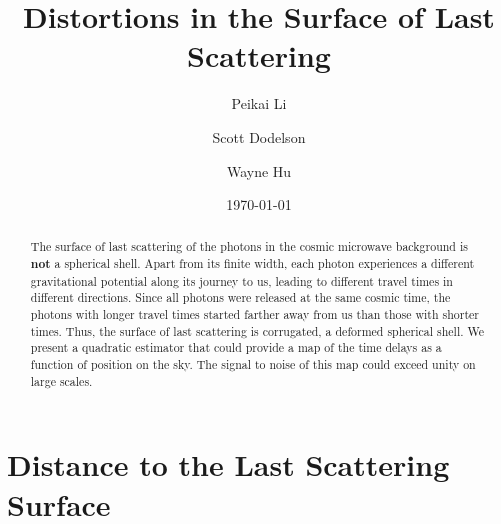 \documentclass[prl,amsmath,amssymb,floatfix,superscriptaddress,nofootinbib,twocolumn]{revtex4-1}
\begin{document}
\title{Distortions in the Surface of Last Scattering}


\author{\large Peikai Li}
\author{\large Scott Dodelson}
\author{\large Wayne Hu}

\date{\today}

\begin{abstract}
The surface of last scattering of the photons in the cosmic microwave background is {\bf not} a spherical shell. Apart from its finite width, each photon experiences a different gravitational potential along its journey to us, leading to different travel times in different directions. Since all photons were released at the same cosmic time, the photons with longer travel times started farther away from us than those with shorter times. Thus, the surface of last scattering is corrugated, a deformed spherical shell. We present a quadratic estimator that could provide a map of the time delays as a function of position on the sky. The signal to noise of this map could exceed unity on large scales.
\end{abstract}

\maketitle

\section{Distance to the Last Scattering Surface}
\newcommand\fd{d}
\end{document}
